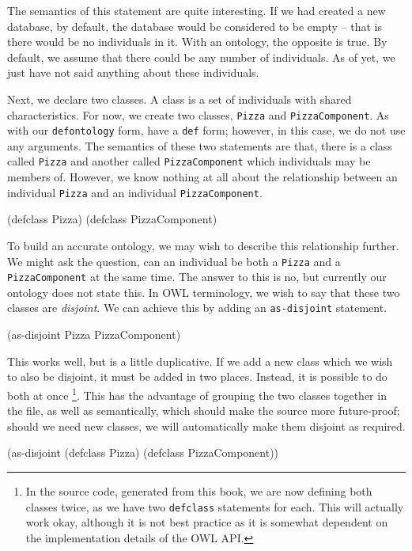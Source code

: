 \documentclass[11pt]{article}
\begin{document}
The semantics of this statement are quite interesting. If we had created
a new database, by default, the database would be considered to be empty
-- that is there would be no individuals in it. With an ontology, the
opposite is true. By default, we assume that there could be any number
of individuals. As of yet, we just have not said anything about these
individuals.

Next, we declare two classes. A class is a set of individuals with
shared characteristics. For now, we create two classes, \verb~Pizza~ and
\verb~PizzaComponent~. As with our \verb~defontology~ form, have a \verb~def~ form;
however, in this case, we do not use any arguments. The semantics of
these two statements are that, there is a class called \verb~Pizza~ and
another called \verb~PizzaComponent~ which individuals may be members of.
However, we know nothing at all about the relationship between an
individual \verb~Pizza~ and an individual \verb~PizzaComponent~.


\begin{tawny}
(defclass Pizza) 
(defclass PizzaComponent)
\end{tawny}

To build an accurate ontology, we may wish to describe this relationship
further. We might ask the question, can an individual be both a \verb~Pizza~
and a \verb~PizzaComponent~ at the same time. The answer to this is no, but
currently our ontology does not state this. In OWL terminology, we wish
to say that these two classes are \emph{disjoint}. We can achieve this by
adding an \verb~as-disjoint~ statement.

\begin{tawny}
(as-disjoint Pizza PizzaComponent)
\end{tawny}

This works well, but is a little duplicative. If we add a new class
which we wish to also be disjoint, it must be added in two places.
Instead, it is possible to do both at once \footnote{In the source code,
generated from this book, we are now defining both classes twice, as we
have two \verb~defclass~ statements for each. This will actually work okay,
although it is not best practice as it is somewhat dependent on the
implementation details of the OWL API.}. This has the advantage of
grouping the two classes together in the file, as well as semantically,
which should make the source more future-proof; should we need new
classes, we will automatically make them disjoint as required.

\begin{tawny}
(as-disjoint
 (defclass Pizza)
 (defclass PizzaComponent))
\end{tawny}
\end{document}

